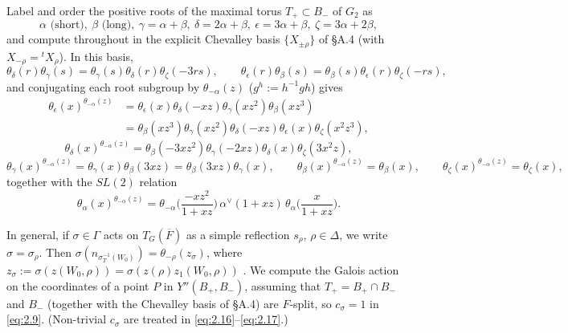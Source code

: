 \documentclass[12pt,letterpaper]{amsart}
\theoremstyle{plain}
\theoremstyle{definition}
\theoremstyle{remark}
\theoremstyle{definition}
\newcommand{\eps}{\epsilon}
\begin{document}
Label and order the positive roots of the maximal torus
$T_+\subset B_-$ of $G_2$ as
\[
\alpha \text{ (short)},\ \beta \text{ (long)},\
\gamma=\alpha +\beta,\ \delta =2\alpha +\beta,\
\epsilon =3\alpha +\beta,\  \zeta=3\alpha +2\beta ,
\]
and compute throughout in the explicit Chevalley basis $\{X_{\pm\rho}\}$ of
\S A.4 (with $X_{-\rho}={}^t X_\rho$). In this basis,
\[
\theta_\delta(r)\theta_\gamma(s)=\theta_\gamma(s)\theta_\delta(r)\theta_{\zeta}(-3rs),\qquad
\theta_\eps(r)\theta_\beta(s)=\theta_\beta(s)\theta_\eps(r)\theta_{\zeta}(-rs),
\]
and conjugating each root subgroup by $\theta_{-\alpha}(z)$ ($g^h:=h^{-1}gh$) gives
\[
\begin{split}
\theta_{\eps}(x)^{\theta_{-\alpha}(z)}
&=\theta_{\eps}(x)\theta_\delta(-xz)\theta_\gamma(xz^2)\theta_\beta(xz^3)\\
&=\theta_\beta(xz^3)\theta_\gamma(xz^2)\theta_\delta(-xz)\theta_{\eps}(x)
\theta_\zeta(x^2z^3),
\end{split}
\]
\[
\theta_{\delta}(x)^{\theta_{-\alpha}(z)}
=\theta_\beta(-3xz^2)\theta_\gamma(-2xz)\theta_{\delta}(x)\theta_\zeta(3x^2z),
\]
\[
\theta_{\gamma}(x)^{\theta_{-\alpha}(z)}
=\theta_{\gamma}(x)\theta_\beta(3xz)=\theta_\beta(3xz)\theta_{\gamma}(x),
\qquad
\theta_{\beta}(x)^{\theta_{-\alpha}(z)}=\theta_{\beta}(x),
\qquad
\theta_{\zeta}(x)^{\theta_{-\alpha}(z)}=\theta_{\zeta}(x),
\]
together with the $SL(2)$ relation
\[
\theta_{\alpha}(x)^{\theta_{-\alpha}(z)}=
\theta_{-\alpha}\Big(\frac{-xz^2}{1+xz}\Big)\,\alpha^\vee(1+xz)\,
\theta_{\alpha}\Big(\frac{x}{1+xz}\Big).
\]

In general, if $\sigma\in\Gamma$ acts on $T_G(\overline{F})$ as a simple
reflection $s_\rho$, $\rho\in\Delta$, we write $\sigma=\sigma_\rho$.
Then $\sigma(n_{\sigma_T^{-1}(W_0)})=\theta_{-\rho}(z_\sigma)$, where
$z_\sigma:=\sigma(z(W_0,\rho))=\sigma(z(\rho)z_1(W_0,\rho))$ \cite[\S 3]{Ha89}.
We compute the Galois action on the coordinates of a point $P$ in
$Y''(B_+,B_-)$, assuming that $T_+=B_+\cap B_-$ and $B_-$ (together with the
Chevalley basis of \S A.4) are $F$-split, so $c_\sigma=1$ in \eqref{eq:2.9}.
(Non-trivial $c_\sigma$ are treated in \eqref{eq:2.16}--\eqref{eq:2.17}.)
\end{document}
